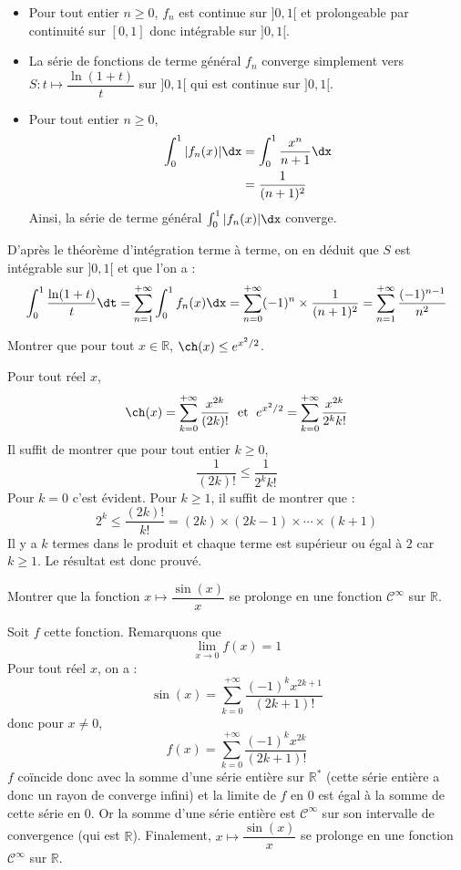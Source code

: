 \documentclass[a4paper,10pt]{report}
\begin{document}
\begin{itemize}
\item Pour tout entier $n \geq 0$, $f_n$ est continue sur $]0,1[$ et prolongeable par continuité sur $[0,1]$ donc intégrable sur $]0,1[$.
\item La série de fonctions de terme général $f_n$ converge simplement vers $S: t \mapsto \dfrac{\ln(1+t)}{t}$ sur $]0,1[$ qui est continue sur $]0,1[$.
\item Pour tout entier $n \geq 0$,
\begin{align*}
\int_0^1 \vert f_n(x) \vert\dx & = \int_0^1 \dfrac{x^n}{n+1} \dx \\
& = \dfrac{1}{(n+1)^2}
\end{align*}
Ainsi, la série de terme général $\int_0^1 \vert f_n(x) \vert\dx$ converge.
\end{itemize}
D'après le théorème d'intégration terme à terme, on en déduit que $S$ est intégrable sur $]0,1[$ et que l'on a :
$$ \int_0^1 \dfrac{\ln(1+t)}{t} \dt = \sum_{n=1}^{+ \infty} \int_0^1 f_n(x) \dx = \sum_{n=0}^{+ \infty} (-1)^{n} \times \dfrac{1}{(n+1)^2} = \sum_{n=1}^{+ \infty} \dfrac{(-1)^{n-1}}{n^2}$$


\begin{Exa} Montrer que pour tout $x \in \mathbb{R}$, $\ch(x) \leq e^{x^2/2}$.
\end{Exa}

\corr Pour tout réel $x$,
$$ \ch(x) = \sum_{k=0}^{+ \infty} \dfrac{x^{2k}}{(2k)!} \; \hbox{ et } \; e^{x^2/2} = \sum_{k=0}^{+ \infty} \dfrac{x^{2k}}{2^k k!}$$
Il suffit de montrer que pour tout entier $k \geq 0$,
$$ \dfrac{1}{(2k)!} \leq \dfrac{1}{2^k	k!}$$
Pour $k=0$ c'est évident. Pour $k \geq 1$, il suffit de montrer que :
$$ 2^k \leq \dfrac{(2k)!}{k!} = (2k) \times (2k-1) \times \cdots \times (k+1)$$
Il y a $k$ termes dans le produit et chaque terme est supérieur ou égal à $2$ car $k \geq 1$. Le résultat est donc prouvé.

\begin{Exa} Montrer que la fonction $x \mapsto \dfrac{\sin(x)}{x}$ se prolonge en une fonction $\mathcal{C}^{\infty}$ sur $\mathbb{R}$.
\end{Exa}

\corr Soit $f$ cette fonction. Remarquons que 
$$ \lim_{x \rightarrow 0} f(x) = 1$$
Pour tout réel $x$, on a :
$$ \sin(x) = \sum_{k=0}^{+ \infty} \dfrac{(-1)^k x^{2k+1}}{(2k+1)!}$$
donc pour $x \neq 0$,
$$ f(x) = \sum_{k=0}^{+ \infty} \dfrac{(-1)^k x^{2k}}{(2k+1)!}$$
$f$ coïncide donc avec la somme d'une série entière sur $\mathbb{R}^*$ (cette série entière a donc un rayon de converge infini) et la limite de $f$ en $0$ est égal à la somme de cette série en $0$. Or la somme d'une série entière est $\mathcal{C}^{\infty}$ sur son intervalle de convergence (qui est $\mathbb{R}$). Finalement, $x \mapsto \dfrac{\sin(x)}{x}$ se prolonge en une fonction $\mathcal{C}^{\infty}$ sur $\mathbb{R}$.
\end{document}
